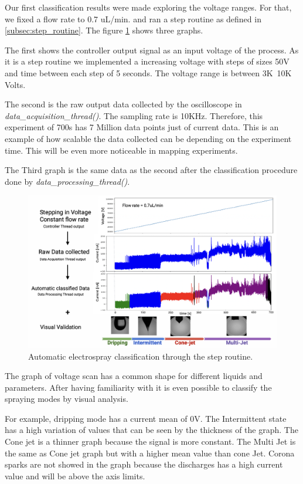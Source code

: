 Our first classification results were made exploring the voltage ranges. 
For that, we fixed a flow rate to 0.7 uL/min. and ran a step routine as defined in \ref{subsec:step_routine}. 
The figure \ref{fig:step_class} shows three graphs. 

The first shows the controller output signal as an input voltage of the process. As it is a step routine we implemented a increasing voltage with steps of sizes 50V and time between each step of 5 seconds. The voltage range is between 3K~10K Volts.

The second is the raw output data collected by the oscilloscope in \emph{data\_acquisition\_thread()}. 
The sampling rate is 10KHz. Therefore, this experiment of 700s has 7 Million data points just of current data. 
This is an example of how scalable the data collected can be depending on the experiment time. This will be even more noticeable in mapping experiments.

The Third graph is the same data as the second after the classification procedure done by \emph{data\_processing\_thread()}. 


\begin{figure}[H]
    \center
    \includegraphics[width=15cm]{Figuras/may/step_class.png}
    \caption{Automatic electrospray classification through the step routine.}
    \label{fig:step_class}
\end{figure}

The graph of voltage scan has a common shape for different liquids and parameters. After having familiarity with it is even possible to classify the spraying modes by visual analysis. 

For example, dripping mode has a current mean of 0V. The Intermittent state has a high variation of values that can be seen by the thickness of the graph. The Cone jet is a thinner graph because the signal is more constant. The Multi Jet is the same as Cone jet graph but with a higher mean value than cone Jet. Corona sparks are not showed in the graph because the discharges has a high current value and will be above the axis limits.



